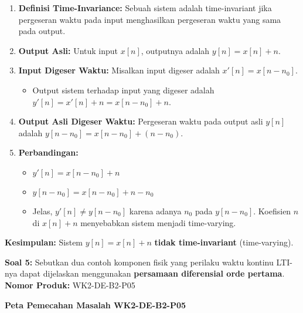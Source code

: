 \documentclass[
  letterpaper,
  DIV=11,
  numbers=noendperiod]{scrreprt}
\providecommand{\tightlist}{%
  \setlength{\itemsep}{0pt}\setlength{\parskip}{0pt}}
\begin{document}
\begin{enumerate}
\def\labelenumi{\arabic{enumi}.}
\tightlist
\item
  \textbf{Definisi Time-Invariance:} Sebuah sistem adalah time-invariant
  jika pergeseran waktu pada input menghasilkan pergeseran waktu yang
  sama pada output.
\item
  \textbf{Output Asli:} Untuk input \(x[n]\), outputnya adalah
  \(y[n] = x[n] + n\).
\item
  \textbf{Input Digeser Waktu:} Misalkan input digeser adalah
  \(x'[n] = x[n-n_0]\).

  \begin{itemize}
  \tightlist
  \item
    Output sistem terhadap input yang digeser adalah
    \(y'[n] = x'[n] + n = x[n-n_0] + n\).
  \end{itemize}
\item
  \textbf{Output Asli Digeser Waktu:} Pergeseran waktu pada output asli
  \(y[n]\) adalah \(y[n-n_0] = x[n-n_0] + (n-n_0)\).
\item
  \textbf{Perbandingan:}

  \begin{itemize}
  \tightlist
  \item
    \(y'[n] = x[n-n_0] + n\)
  \item
    \(y[n-n_0] = x[n-n_0] + n - n_0\)
  \item
    Jelas, \(y'[n] \neq y[n-n_0]\) karena adanya \(n_0\) pada
    \(y[n-n_0]\). Koefisien \(n\) di \(x[n]+n\) menyebabkan sistem
    menjadi time-varying.
  \end{itemize}
\end{enumerate}

\textbf{Kesimpulan:} Sistem \(y[n] = x[n] + n\) \textbf{tidak
time-invariant} (time-varying).

\textbf{Soal 5:} Sebutkan dua contoh komponen fisik yang perilaku waktu
kontinu LTI-nya dapat dijelaskan menggunakan \textbf{persamaan
diferensial orde pertama}. \textbf{Nomor Produk:} WK2-DE-B2-P05

\textbf{Peta Pemecahan Masalah WK2-DE-B2-P05}
\end{document}
